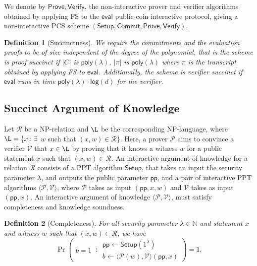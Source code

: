 \documentclass[sigconf]{acmart}
\newtheorem{definition}{Definition}[section]
\newcommand{\pp}{\mathsf{pp}}
\newcommand{\prover}{\ensuremath{\mathcal{P}}}
\newcommand{\verifier}{\ensuremath{\mathcal{V}}}
\newcommand{\R}{\mathcal{R}}
\newcommand{\setup}{\mathsf{Setup}}
\newcommand{\pcsetup}{\mathsf{Setup}}
\newcommand{\pccommit}{\mathsf{Commit}}
\newcommand{\pceval}{\mathsf{eval}}
\newcommand{\pccheck}{\mathsf{check}}
\newcommand{\secp}{\ensuremath{\lambda}}
\begin{document}
		We denote by $\mathsf{Prove}, \mathsf{Verify}$, the non-interactive prover and verifier algorithms obtained by applying FS to the 
		$\pceval$ public-coin interactive protocol, giving a non-interactive PCS scheme $(\pcsetup,\pccommit,\allowbreak \mathsf{Prove},\mathsf{Verify})$.
		
		\begin{definition}[Succinctness]
			\label{def:pcs-succinct}
			We require the commitments and the evaluation proofs to be of size independent of the degree of the polynomial, that is the scheme is \emph{proof succinct} if
			$|C|$ is $\mathsf{poly}(\secp)$, $|\pi|$ is $\mathsf{poly}(\secp)$ where $\pi$ is the transcript obtained by applying FS to $\pceval$. Additionally, the scheme is \emph{verifier succinct} if $\pceval$ runs in time
			$\mathsf{poly}(\secp) \cdot \allowbreak \mathsf{log} (d)$ for the verifier.
		\end{definition}
		
		
		\subsection{Succinct Argument of Knowledge}
		\label{sec:aok}
		
		Let $\R$ be a NP-relation and $\L$ be the corresponding NP-language, where $\L=\{x : \exists$ $w$ such that $(x,w) \in \R\}$. Here, a prover $\prover$ aims to convince a verifier $\verifier$ that $x\in \L$ by proving that it knows a witness $w$ for a public statement $x$ such that $(x,w)\in \R$. An interactive argument of knowledge for a relation $\R$ consists of a PPT algorithm $\setup$, that takes an input the security parameter $\secp$, and outputs the public parameter $\pp$, and a pair of interactive PPT algorithms $\langle\prover,\verifier\rangle$, where $\prover$ takes as input $(\pp,x,w)$ and $\verifier$ takes as input $(\pp,x)$. An interactive argument of knowledge  $\langle\prover,\verifier\rangle$, must satisfy completeness and knowledge soundness. %
		
		\begin{definition}[Completeness]
			\label{def:aok-comp}
			For all security parameter $\secp \in \mathbb{N}$ and statement $x$ and witness $w$ such that $(x,w)\in \R$, we have
			\[
			\Pr \left( 
			\begin{matrix}
				b=1
			\end{matrix}
			\,:\,
			\begin{matrix}
				\pp \leftarrow \setup(1^\secp) \\
				b \leftarrow \langle\prover (w) ,\verifier\rangle (\pp,x)
			\end{matrix}
			\right) = 1.
			\]
		\end{definition}
		
\end{document}
